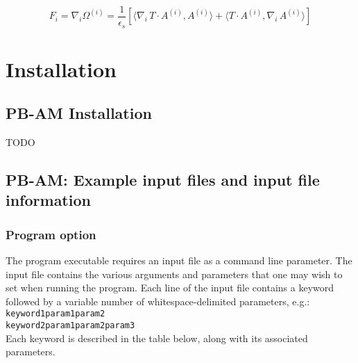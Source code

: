 \[ F_i = \nabla_i \Omega^{(i)}=\frac{1}{\epsilon_s} [ \langle \nabla_i \,T \cdot A^{(i) } ,  A^{(i) } \rangle +  \langle T \cdot A^{(i) } ,   \nabla_i \, A^{(i) } \rangle ]\]


\clearpage


\section{Installation}

\subsection{PB-AM Installation}

TODO





\subsection{PB-AM: Example input files and input file information}

\subsubsection{Program option}

The program executable requires an input file as a command line parameter. The input file contains the various arguments and parameters that one may wish to set when running the program. Each line of the input file contains a keyword followed by a variable number of whitespace-delimited parameters, e.g.: \\

\texttt{keyword1\qquad param1\qquad param2} \\
\texttt{keyword2\qquad param1\qquad param2\qquad param3} \\

Each keyword is described in the table below, along with its associated parameters.


